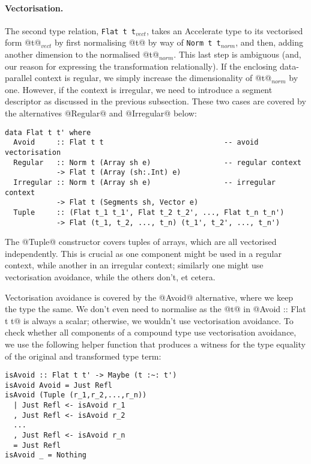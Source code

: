 \paragraph{Vectorisation.}
The second type relation, \lstinline[style=ndp]{Flat t t}$_{\textit{vect}}$, takes an Accelerate type to its vectorised form @t@$_{\textit{vect}}$ by first normalising @t@ by way of \lstinline[style=ndp]{Norm t t}$_{\textit{norm}}$, and then, adding another dimension to the normalised @t@$_{\textit{norm}}$. This last step is ambiguous (and, our reason for expressing the transformation relationally). If the enclosing data-parallel context is regular, we simply increase the dimensionality of @t@$_{\textit{norm}}$ by one. However, if the context is irregular, we need to introduce a segment descriptor as discussed in the previous subsection. These two cases are covered by the alternatives @Regular@ and @Irregular@ below:
%
\begin{lstlisting}[style=ndp]
data Flat t t' where
  Avoid     :: Flat t t                            -- avoid vectorisation
  Regular   :: Norm t (Array sh e)                 -- regular context
            -> Flat t (Array (sh:.Int) e)
  Irregular :: Norm t (Array sh e)                 -- irregular context
            -> Flat t (Segments sh, Vector e)
  Tuple     :: (Flat t_1 t_1', Flat t_2 t_2', ..., Flat t_n t_n')
            -> Flat (t_1, t_2, ..., t_n) (t_1', t_2', ..., t_n')
\end{lstlisting}
%
The @Tuple@ constructor covers tuples of arrays, which are all vectorised independently. This is crucial as one component might be used in a regular context, while another in an irregular context; similarly one might use vectorisation avoidance, while the others don't, et cetera.

Vectorisation avoidance is covered by the @Avoid@ alternative, where we keep the type the same. We don't even need to normalise as the @t@ in @Avoid :: Flat t t@ is always a scalar; otherwise, we wouldn't use vectorisation avoidance. To check whether all components of a compound type use vectorisation avoidance, we use the following helper function that produces a witness for the type equality of the original and transformed type term:
%
\begin{lstlisting}[style=ndp]
isAvoid :: Flat t t' -> Maybe (t :~: t')
isAvoid Avoid = Just Refl
isAvoid (Tuple (r_1,r_2,...,r_n))
  | Just Refl <- isAvoid r_1
  , Just Refl <- isAvoid r_2
  ...
  , Just Refl <- isAvoid r_n
  = Just Refl
isAvoid _ = Nothing
\end{lstlisting}

